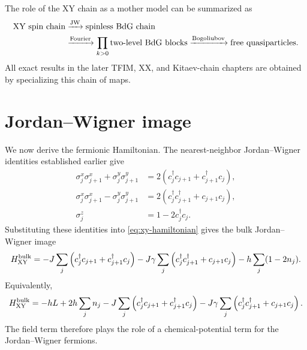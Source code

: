 The role of the XY chain as a mother model can be summarized as
\begin{equation}
\label{eq:xy-mother-model-map}
\begin{aligned}
    \text{XY spin chain}
    &\xrightarrow{\rm JW}
    \text{spinless BdG chain}\\
    &\xrightarrow{\rm Fourier}
    \prod_{k>0}\text{two-level BdG blocks}
    \xrightarrow{\rm Bogoliubov}
    \text{free quasiparticles}.
\end{aligned}
\end{equation}
All exact results in the later TFIM, XX, and Kitaev-chain chapters are obtained
by specializing this chain of maps.

\section{Jordan--Wigner image}
\label{sec:xy-jordan-wigner-image}

We now derive the fermionic Hamiltonian.  The nearest-neighbor Jordan--Wigner
identities established earlier give
\begin{align}
\label{eq:xy-mother-jw-xx-plus-yy}
    \sigma_j^x\sigma_{j+1}^x+
    \sigma_j^y\sigma_{j+1}^y
    &=
    2\left(
        c_j^\dagger c_{j+1}+c_{j+1}^\dagger c_j
    \right),
    \\
\label{eq:xy-mother-jw-xx-minus-yy}
    \sigma_j^x\sigma_{j+1}^x-
    \sigma_j^y\sigma_{j+1}^y
    &=
    2\left(
        c_j^\dagger c_{j+1}^\dagger+c_{j+1}c_j
    \right),
    \\
\label{eq:xy-mother-jw-z}
    \sigma_j^z&=1-2c_j^\dagger c_j.
\end{align}
Substituting these identities into \cref{eq:xy-hamiltonian} gives the
bulk Jordan--Wigner image
\begin{equation}
\label{eq:xy-mother-bulk-fermion-hamiltonian}
    H_{\rm XY}^{\rm bulk}
    =
    -J\sum_j
    \left(
        c_j^\dagger c_{j+1}+c_{j+1}^\dagger c_j
    \right)
    -J\gamma\sum_j
    \left(
        c_j^\dagger c_{j+1}^\dagger+c_{j+1}c_j
    \right)
    -h\sum_j(1-2n_j).
\end{equation}
Equivalently,
\begin{equation}
\label{eq:xy-mother-bulk-fermion-expanded}
    H_{\rm XY}^{\rm bulk}
    =
    -hL
    +2h\sum_j n_j
    -J\sum_j
    \left(
        c_j^\dagger c_{j+1}+c_{j+1}^\dagger c_j
    \right)
    -J\gamma\sum_j
    \left(
        c_j^\dagger c_{j+1}^\dagger+c_{j+1}c_j
    \right).
\end{equation}
The field term therefore plays the role of a chemical-potential term for the
Jordan--Wigner fermions.

